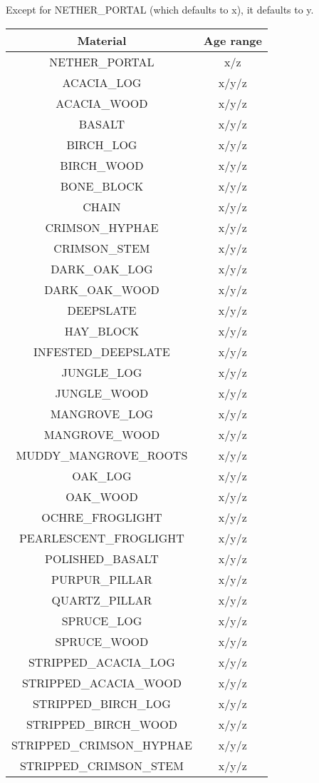 Except for NETHER\_PORTAL (which defaults to x), it defaults to y.

\begin{longtable}{ |c|c| }
	\hline
	Material & Age range \\
	\hline
	\endhead
	NETHER\_PORTAL & x/z \\
	ACACIA\_LOG & x/y/z \\
	ACACIA\_WOOD & x/y/z \\
	BASALT & x/y/z \\
	BIRCH\_LOG & x/y/z \\
	BIRCH\_WOOD & x/y/z \\
	BONE\_BLOCK & x/y/z \\
	CHAIN & x/y/z \\
	CRIMSON\_HYPHAE & x/y/z \\
	CRIMSON\_STEM & x/y/z \\
	DARK\_OAK\_LOG & x/y/z \\
	DARK\_OAK\_WOOD & x/y/z \\
	DEEPSLATE & x/y/z \\
	HAY\_BLOCK & x/y/z \\
	INFESTED\_DEEPSLATE & x/y/z \\
	JUNGLE\_LOG & x/y/z \\
	JUNGLE\_WOOD & x/y/z \\
	MANGROVE\_LOG & x/y/z \\
	MANGROVE\_WOOD & x/y/z \\
	MUDDY\_MANGROVE\_ROOTS & x/y/z \\
	OAK\_LOG & x/y/z \\
	OAK\_WOOD & x/y/z \\
	OCHRE\_FROGLIGHT & x/y/z \\
	PEARLESCENT\_FROGLIGHT & x/y/z \\
	POLISHED\_BASALT & x/y/z \\
	PURPUR\_PILLAR & x/y/z \\
	QUARTZ\_PILLAR & x/y/z \\
	SPRUCE\_LOG & x/y/z \\
	SPRUCE\_WOOD & x/y/z \\
	STRIPPED\_ACACIA\_LOG & x/y/z \\
	STRIPPED\_ACACIA\_WOOD & x/y/z \\
	STRIPPED\_BIRCH\_LOG & x/y/z \\
	STRIPPED\_BIRCH\_WOOD & x/y/z \\
	STRIPPED\_CRIMSON\_HYPHAE & x/y/z \\
	STRIPPED\_CRIMSON\_STEM & x/y/z \\

\end{longtable}
